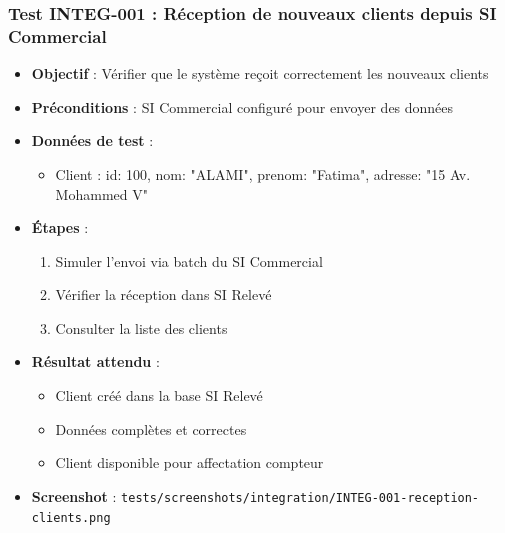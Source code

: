 \subsubsection{Test INTEG-001 : Réception de nouveaux clients depuis SI Commercial}
\begin{itemize}
    \item \textbf{Objectif} : Vérifier que le système reçoit correctement les nouveaux clients
    \item \textbf{Préconditions} : SI Commercial configuré pour envoyer des données
    \item \textbf{Données de test} :
        \begin{itemize}
            \item Client : {id: 100, nom: "ALAMI", prenom: "Fatima", adresse: "15 Av. Mohammed V"}
        \end{itemize}
    \item \textbf{Étapes} :
        \begin{enumerate}
            \item Simuler l'envoi via batch du SI Commercial
            \item Vérifier la réception dans SI Relevé
            \item Consulter la liste des clients
        \end{enumerate}
    \item \textbf{Résultat attendu} : 
        \begin{itemize}
            \item Client créé dans la base SI Relevé
            \item Données complètes et correctes
            \item Client disponible pour affectation compteur
        \end{itemize}
    \item \textbf{Screenshot} : \texttt{tests/screenshots/integration/INTEG-001-reception-clients.png}
\end{itemize}

